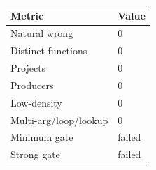 \begin{tabular}{ll}
\toprule
Metric & Value \\
\midrule
Natural wrong & 0 \\
Distinct functions & 0 \\
Projects & 0 \\
Producers & 0 \\
Low-density & 0 \\
Multi-arg/loop/lookup & 0 \\
Minimum gate & failed \\
Strong gate & failed \\
\bottomrule
\end{tabular}
